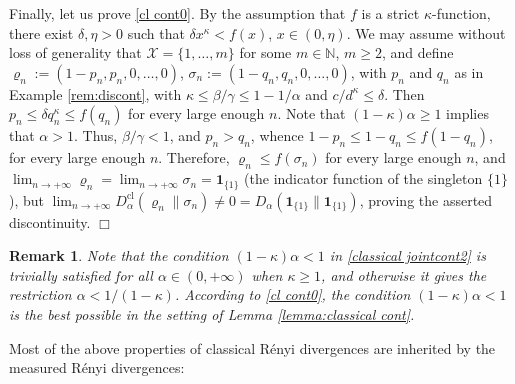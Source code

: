 \documentclass[unsortedaddress,superscriptaddress,pra,notitlepage]{revtex4}
\newtheorem{rem}[definition]{Remark}
\newenvironment{proof}[1][Proof]{\begin{trivlist}
\item[\hskip \labelsep {\bfseries #1}]}{\hfill$\Box$\end{trivlist}}
\def\X{{\mathcal X}}
\def\bN{\mathbb{N}}
\def\rho{\varrho}
\def\egy{\mathbf 1}
\def\cl{\mathrm{cl}}
\def\cl{\mathrm{cl}}
\def\pwr{\kappa}
\begin{document}
\begin{proof}
Finally, let us prove \ref{cl cont0}.
By the assumption that $f$ is a strict $\pwr$-function, there exist 
$\delta,\eta>0$ such that $\delta x^{\pwr}<f(x)$, $x\in(0,\eta)$. 
We may assume without loss of generality that $\X=\{1,\ldots,m\}$ for some $m\in\bN$, 
$m\ge 2$, and define
$\rho_n:=(1-p_n,p_n,0,\ldots,0)$,
$\sigma_n:=(1-q_n,q_n,0,\ldots,0)$,
with $p_n$ and $q_n$ as in Example \ref{rem:discont}, 
with $\pwr\le\beta/\gamma\le 1-1/\alpha$ and $c/d^{\pwr}\le\delta$.
Then $p_n\le \delta q_n^{\pwr}\le f(q_n)$ for every large enough $n$.
Note that $(1-\pwr)\alpha\ge 1$ implies that $\alpha>1$. 
Thus, $\beta/\gamma<1$, and $p_n>q_n$, whence $1-p_n\le 1-q_n\le f(1-q_n)$, for every large enough $n$. Therefore,  
$\rho_n\le f(\sigma_n)$ for every large enough $n$, 
and $\lim_{n\to+\infty}\rho_n=\lim_{n\to+\infty}\sigma_n=\egy_{\{1\}}$
(the indicator function of the singleton $\{1\}$), 
but 
$\lim_{n\to+\infty}D_{\alpha}^{\cl}(\rho_n\|\sigma_n)\ne 0=
D_{\alpha}(\egy_{\{1\}}\|\egy_{\{1\}})$, proving the asserted discontinuity.
\end{proof}

\begin{rem}\label{rem:alpha restriction}
Note that the condition $(1-\pwr)\alpha<1$ in \eqref{classical jointcont2} is trivially satisfied for all $\alpha\in(0,+\infty)$ when $\pwr\ge 1$, and otherwise it gives the restriction $\alpha<1/(1-\pwr)$.
According to \ref{cl cont0}, the condition $(1-\pwr)\alpha<1$ is the best possible in
the setting of Lemma \ref{lemma:classical cont}.
\end{rem}

Most of the above properties of classical R\'enyi divergences are inherited by the measured R\'enyi divergences:
\end{document}
